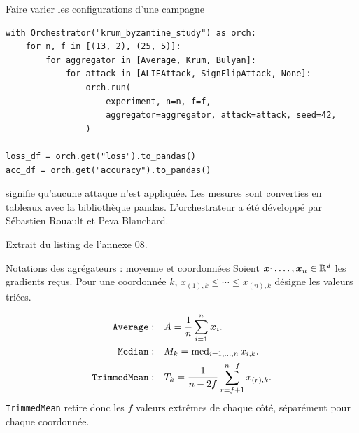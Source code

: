 \begin{frame}[fragile]{Faire varier les configurations d'une campagne}
    \small
    \begin{verbatim}
with Orchestrator("krum_byzantine_study") as orch:
    for n, f in [(13, 2), (25, 5)]:
        for aggregator in [Average, Krum, Bulyan]:
            for attack in [ALIEAttack, SignFlipAttack, None]:
                orch.run(
                    experiment, n=n, f=f,
                    aggregator=aggregator, attack=attack, seed=42,
                )

loss_df = orch.get("loss").to_pandas()
acc_df = orch.get("accuracy").to_pandas()
    \end{verbatim}

     signifie qu'aucune attaque n'est appliquée.
    Les mesures sont converties en tableaux avec la bibliothèque pandas.
    L'orchestrateur a été développé par Sébastien Rouault et Peva Blanchard.

    \medskip
    {\footnotesize Extrait du listing de l'annexe 08.}
\end{frame}

\begin{frame}{Notations des agrégateurs : moyenne et coordonnées}
    \small
    Soient $\boldsymbol{x}_1,\ldots,\boldsymbol{x}_n\in\mathbb{R}^d$ les gradients reçus.
    Pour une coordonnée $k$, $x_{(1),k}\leq\cdots\leq x_{(n),k}$ désigne
    les valeurs triées.

    \begin{align*}
        \texttt{Average}:\quad
        & A=\frac{1}{n}\sum_{i=1}^{n}\boldsymbol{x}_i.
        \\
        \texttt{Median}:\quad
        & M_k=\operatorname{med}_{i=1,\ldots,n}x_{i,k}.
        \\
        \texttt{TrimmedMean}:\quad
        & T_k=\frac{1}{n-2f}\sum_{r=f+1}^{n-f}x_{(r),k}.
    \end{align*}
    \texttt{TrimmedMean} retire donc les $f$ valeurs extrêmes de chaque côté,
    séparément pour chaque coordonnée.
\end{frame}

